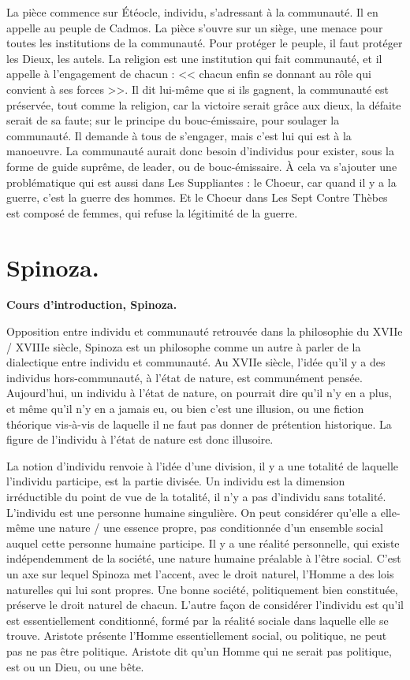 \documentclass[11pt]{article}
\begin{document}
La pièce commence sur Étéocle, individu, s'adressant à la communauté. Il en appelle au peuple de Cadmos. La pièce s'ouvre sur un siège, une menace pour toutes les institutions de la communauté. Pour protéger le peuple, il faut protéger les Dieux, les autels. La religion est une institution qui fait communauté, et il appelle à l'engagement de chacun : << chacun enfin se donnant au rôle qui convient à ses forces >>. Il dit lui-même que si ils gagnent, la communauté est préservée, tout comme la religion, car la victoire serait grâce aux dieux, la défaite serait de sa faute; sur le principe du bouc-émissaire, pour soulager la communauté. Il demande à tous de s'engager, mais c'est lui qui est à la manoeuvre. La communauté aurait donc besoin d'individus pour exister, sous la forme de guide suprême, de leader, ou de bouc-émissaire. À cela va s'ajouter une problématique qui est aussi dans Les Suppliantes : le Choeur, car quand il y a la guerre, c'est la guerre des hommes. Et le Choeur dans Les Sept Contre Thèbes est composé de femmes, qui refuse la légitimité de la guerre.



\pagebreak

\section{Spinoza.}

\bf{Cours d'introduction, Spinoza.}

Opposition entre individu et communauté retrouvée dans la philosophie du XVIIe / XVIIIe siècle, Spinoza est un philosophe comme un autre à parler de la dialectique entre individu et communauté. Au XVIIe siècle, l'idée qu'il y a des individus hors-communauté, à l'état de nature, est communément pensée. Aujourd'hui, un individu à l'état de nature, on pourrait dire qu'il n'y en a plus, et même qu'il n'y en a jamais eu, ou bien c'est une illusion, ou une fiction théorique vis-à-vis de laquelle il ne faut pas donner de prétention historique. La figure de l'individu à l'état de nature est donc illusoire.

La notion d'individu renvoie à l'idée d'une division, il y a une totalité de laquelle l'individu participe, est la partie divisée. Un individu est la dimension irréductible du point de vue de la totalité, il n'y a pas d'individu sans totalité. L'individu est une personne humaine singulière.
On peut considérer qu'elle a elle-même une nature / une essence propre, pas conditionnée d'un ensemble social auquel cette personne humaine participe. Il y a une réalité personnelle, qui existe indépendemment de la société, une nature humaine préalable à l'être social. C'est un axe sur lequel Spinoza met l'accent, avec le droit naturel, l'Homme a des lois naturelles qui lui sont propres. Une bonne société, politiquement bien constituée, préserve le droit naturel de chacun.
L'autre façon de considérer l'individu est qu'il est essentiellement conditionné, formé par la réalité sociale dans laquelle elle se trouve. Aristote présente l'Homme essentiellement social, ou politique, ne peut pas ne pas être politique. Aristote dit qu'un Homme qui ne serait pas politique, est ou un Dieu, ou une bête. 
\end{document}
